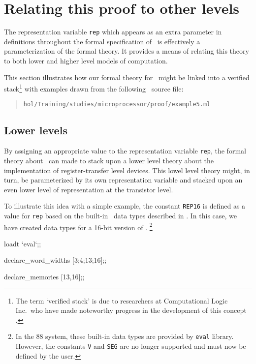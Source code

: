 \section{Relating this proof to other levels}
\label{sec-relate}

The representation variable \verb"rep" which appears as an extra
parameter in definitions throughout the formal specification of \Tamarack\
is effectively a parameterization of the formal theory.
It provides a means of relating this theory to
both lower and higher level models of computation.

This section illustrates how our formal theory for \Tamarack\
might be linked into a verified 
stack\footnote{
The term `verified stack' is
due to researchers at Computational Logic Inc.\ who
have made noteworthy progress in the development of this concept
\cite{Bevier87,Bevier89}.}
with examples drawn from
the following \HOL\ source file:

\begin{quote}
\verb"hol/Training/studies/microprocessor/proof/example5.ml"
\end{quote}

\subsection{Lower levels}

By assigning an appropriate value to
the representation variable \verb"rep",
the formal theory about \Tamarack\ can made
to stack upon
a lower level theory about the implementation
of register-transfer level devices.
This lowel level theory might, in turn, be parameterized by its own
representation variable
and stacked upon an even lower level of representation at the transistor
level.

To illustrate this idea with a simple example,
the constant \verb"REP16" is defined
as a value for \verb"rep" based on the built-in \HOL\ data types
described in
\cite{Gordon:tech41,Joyce:calgary86,Cohn:banff87}.
In this case, we have created data types for a \mbox{16-bit} version
of \Tamarack.
\footnote{
In the {\HOL}88 system,
these built-in data types are provided by
\verb"eval" library.
However,
the constants \verb"V" and \verb"SEG" are no longer supported
and must now be defined by the user.}

\newpage %


\begintt
loadt `eval`;;

declare_word_widths [3;4;13;16];;

declare_memories [13,16];;


